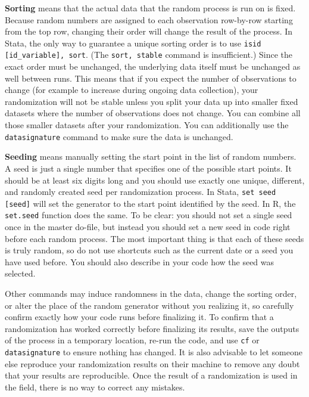 \textbf{Sorting} means that the actual data that the random process is run on is fixed.
Because random numbers are assigned to each observation row-by-row starting from
the top row,
changing their order will change the result of the process.
In Stata, the only way to guarantee a unique sorting order is to use
\texttt{isid [id\_variable], sort}.
(The \texttt{sort, stable} command is insufficient.)
Since the exact order must be unchanged,
the underlying data itself must be unchanged as well between runs.
This means that if you expect the number of observations to change
(for example to increase during ongoing data collection),
your randomization will not be stable unless you split your data up into
smaller fixed datasets where the number of observations does not change.
You can combine all
those smaller datasets after your randomization.
You can additionally use the \texttt{datasignature} command to make sure the
data is unchanged.

\textbf{Seeding} means manually setting the start point in the list of random numbers.
A seed is just a single number that specifies one of the possible start points.
It should be at least six digits long and you should use exactly
one unique, different, and randomly created seed per randomization process.
In Stata, \texttt{set seed [seed]} will set the generator
to the start point identified by the seed.
In R, the \texttt{set.seed} function does the same.
To be clear: you should not set a single seed once in the master do-file,
but instead you should set a new seed in code right before each random process.
The most important thing is that each of these seeds is truly random,
so do not use shortcuts such as the current date or a seed you have used before.
You should also describe in your code how the seed was selected.

Other commands may induce randomness in the data,
change the sorting order,
or alter the place of the random generator without you realizing it,
so carefully confirm exactly how your code runs before finalizing it.
To confirm that a randomization has worked correctly before finalizing its results,
save the outputs of the process in a temporary location,
re-run the code, and use \texttt{cf} or \texttt{datasignature} to ensure
nothing has changed. It is also advisable to let someone else reproduce your
randomization results on their machine to remove any doubt that your results
are reproducible.
Once the result of a randomization is used in the field,
there is no way to correct any mistakes.

